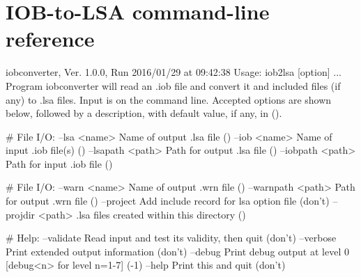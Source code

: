 \chapter{IOB-to-LSA command-line reference}

\begin{Snippet}
iobconverter, Ver. 1.0.0, Run 2016/01/29 at 09:42:38
Usage: iob2lsa [option] ...
 Program iobconverter will read an .iob file and convert it
and included files (if any) to .lsa files. Input is on the command line.
Accepted options are shown below, followed by a description,
with default value, if any, in ().

# File I/O:
 --lsa <name>      Name of output .lsa file ()
 --iob <name>      Name of input .iob file(s) ()
 --lsapath <path>  Path for output .lsa file ()
 --iobpath <path>  Path for input .iob file ()

# File I/O:
 --warn <name>     Name of output .wrn file ()
 --warnpath <path> Path for output .wrn file ()
 --project         Add include record for lsa option file (don't)
 --projdir <path>  .lsa files created within this directory ()

# Help:
 --validate        Read input and test its validity, then quit (don't)
 --verbose         Print extended output information (don't)
 --debug           Print debug output at level 0 [debug<n> for level n=1-7] (-1)
 --help            Print this and quit (don't)
\end{Snippet}
